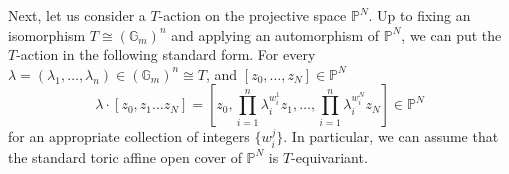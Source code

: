 \documentclass[11pt,letterpaper]{amsart}
\newtheorem{remark}[dummy]{Remark}
\newcommand{\bG}{\mathbb{G}}
\newcommand{\bP}{\mathbb{P}}
\begin{document}

Next, let us consider a $T$-action on the projective space $\mathbb{P}^N$. Up to fixing an isomorphism $T \cong (\bG_m)^n$ and applying an  automorphism of $\mathbb{P}^N$, we can put the $T$-action in the following   standard form. For  every $ \lambda = 
    (\lambda_1, \ldots, \lambda_n) \in (\mathbb{G}_m)^n \cong T$,  and $[z_0, \ldots, z_N] \in \bP^N$
\begin{equation}
\label{standardform}
\lambda  \cdot [z_0, z_1 \ldots z_N] =    [z_0, \prod_{i=1}^{n}\lambda_i^{w^1_i}z_1,\dots,\prod_{i=1}^{n}\lambda_i^{w^N_i}z_N] \in \bP^N  
\end{equation} 
for an appropriate collection of integers  $\{ w_i^j \}$.  
In particular, 
 we can assume that the standard toric affine open cover of $\mathbb{P}^N$ is $T$-equivariant.  
 
\end{document}
